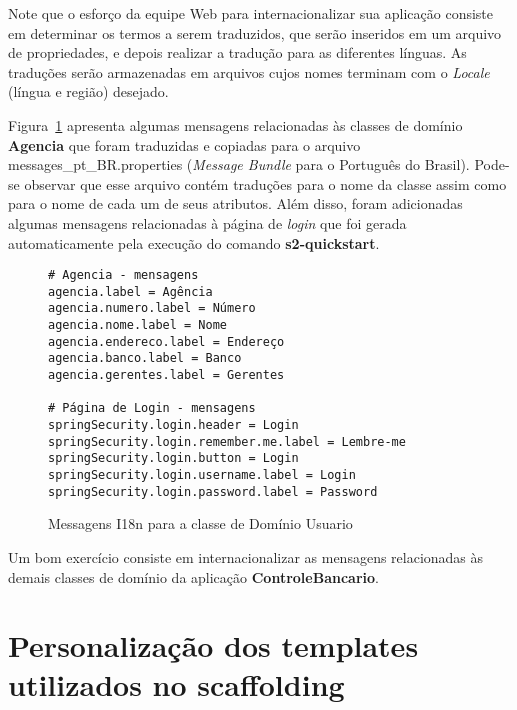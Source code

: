 \noindent Note que o esforço  da equipe Web para internacionalizar sua aplicação
consiste em determinar  os termos a serem traduzidos, que  serão inseridos em um
arquivo  de  propriedades, e  depois  realizar  a  tradução para  as  diferentes
línguas.  As traduções serão armazenadas  em arquivos cujos nomes terminam com o
{\it Locale} (língua e região) desejado.

\vspace{0.2cm}

Figura~\ref{Agenda18nFig} apresenta algumas mensagens relacionadas às classes de
domínio  {\bf  Agencia}   que  foram  traduzidas  e  copiadas   para  o  arquivo
messages\_pt\_BR.properties   ({\it  Message   Bundle}  para   o   Português  do
Brasil).  Pode-se observar  que esse  arquivo contém  traduções para  o  nome da
classe assim como  para o nome de  cada um de seus atributos.  Além disso, foram
adicionadas  algumas mensagens  relacionadas à  página  de {\it  login} que  foi
gerada automaticamente pela execução do comando {\bf s2-quickstart}. 

\begin{figure}[htbp]
\begin{mdframed}
\begin{footnotesize}
\begin{verbatim}
# Agencia - mensagens
agencia.label = Agência
agencia.numero.label = Número
agencia.nome.label = Nome
agencia.endereco.label = Endereço
agencia.banco.label = Banco
agencia.gerentes.label = Gerentes

# Página de Login - mensagens
springSecurity.login.header = Login
springSecurity.login.remember.me.label = Lembre-me
springSecurity.login.button = Login
springSecurity.login.username.label = Login
springSecurity.login.password.label = Password
\end{verbatim}
\end{footnotesize}
\end{mdframed}
\caption{Messagens I18n para a classe de Domínio Usuario}
\label{Agenda18nFig}
\end{figure}

\begin{remark}
Um  bom exercício  consiste em  internacionalizar as  mensagens  relacionadas às
demais classes de domínio da aplicação {\bf ControleBancario}.  
\end{remark}

\section{Personalização dos templates utilizados no scaffolding}

